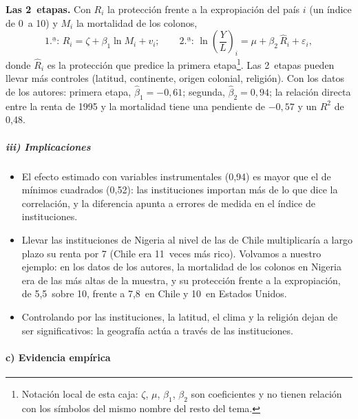 \documentclass[11pt]{article}
\begin{document}
\begin{anotaciones}
\textbf{Las 2~etapas.} Con $R_i$ la protección frente a la expropiación del país $i$ (un índice de 0~a 10) y $M_i$ la mortalidad de los colonos,
\begin{equation}
\text{1.ª: } R_i=\zeta+\beta_1\ln M_i+v_i;\qquad \text{2.ª: } \ln\left(\frac{Y}{L}\right)_i=\mu+\beta_2\,\hat R_i+\varepsilon_i ,\label{eq:ajr-etapas}
\end{equation}
donde $\hat R_i$ es la protección que predice la primera etapa\footnote{Notación local de esta caja: $\zeta$, $\mu$, $\beta_1$, $\beta_2$ son coeficientes y no tienen relación con los símbolos del mismo nombre del resto del tema.}. Las 2~etapas pueden llevar más controles (latitud, continente, origen colonial, religión). Con los datos de los autores: primera etapa, $\hat\beta_1=-0{,}61$; segunda, $\hat\beta_2=0{,}94$; la relación directa entre la renta de 1995 y la mortalidad tiene una pendiente de $-0{,}57$ y un $R^2$ de 0,48\nocite{AJR2001Datos}.
\end{anotaciones}

\subparagraph{iii) Implicaciones}

\begin{itemize}
\item El efecto estimado con variables instrumentales (0,94) es mayor que el de mínimos cuadrados (0,52): las instituciones importan más de lo que dice la correlación, y la diferencia apunta a errores de medida en el índice de instituciones.
\item Llevar las instituciones de Nigeria al nivel de las de Chile multiplicaría a largo plazo su renta por 7 (Chile era 11~veces más rico)\nocite{AcemogluJohnsonRobinson2001Colonial}. Volvamos a nuestro ejemplo: en los datos de los autores, la mortalidad de los colonos en Nigeria era de las más altas de la muestra, y su protección frente a la expropiación, de 5,5~sobre 10, frente a 7,8~en Chile y 10~en Estados Unidos\nocite{AJR2001Datos}.
\item Controlando por las instituciones, la latitud, el clima y la religión dejan de ser significativos: la geografía actúa a través de las instituciones.
\end{itemize}

\paragraph{c) Evidencia empírica}
\end{document}
